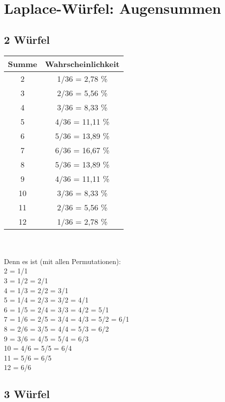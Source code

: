 \documentclass{article}
\begin{document}
\section{Laplace-Würfel: Augensummen}
\subsection{2 Würfel}
\begin{tabular}{c | c}
Summe & Wahrscheinlichkeit \\
\hline
2 & 1/36 = 2,78 \% \\
3 & 2/36 = 5,56 \%\\
4 & 3/36 = 8,33 \%\\
5 & 4/36 = 11,11 \%\\
6 & 5/36 = 13,89 \%\\
7 & 6/36 = 16,67 \%\\
8 & 5/36 = 13,89 \%\\
9 & 4/36 = 11,11 \%\\
10 & 3/36 = 8,33 \%\\
11 & 2/36 = 5,56 \%\\
12 & 1/36 = 2,78 \%
\end{tabular}
 \\\\
Denn es ist (mit allen Permutationen):\\
2 = 1/1\\
3 = 1/2 = 2/1\\
4 = 1/3 = 2/2 = 3/1\\
5 = 1/4 = 2/3 = 3/2 = 4/1\\
6 = 1/5 = 2/4 = 3/3 = 4/2 = 5/1\\
7 = 1/6 = 2/5 = 3/4 = 4/3 = 5/2 = 6/1\\
8 = 2/6 = 3/5 = 4/4 = 5/3 = 6/2\\
9 = 3/6 = 4/5 = 5/4 = 6/3\\
10 = 4/6 = 5/5 = 6/4\\
11 = 5/6 = 6/5\\
12 = 6/6

\subsection{3 Würfel}
\end{document}
